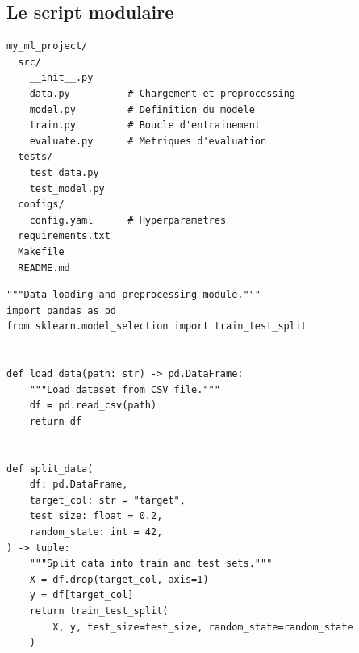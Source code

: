 \subsection{Le script modulaire}

\begin{bonnepratique}[title=\textbf{Structure de projet recommand\'ee}]
\begin{verbatim}
my_ml_project/
  src/
    __init__.py
    data.py          # Chargement et preprocessing
    model.py         # Definition du modele
    train.py         # Boucle d'entrainement
    evaluate.py      # Metriques d'evaluation
  tests/
    test_data.py
    test_model.py
  configs/
    config.yaml      # Hyperparametres
  requirements.txt
  Makefile
  README.md
\end{verbatim}
\end{bonnepratique}

\begin{codeblock}[title=\textbf{src/data.py --- Module de donn\'ees}]
\begin{verbatim}
"""Data loading and preprocessing module."""
import pandas as pd
from sklearn.model_selection import train_test_split


def load_data(path: str) -> pd.DataFrame:
    """Load dataset from CSV file."""
    df = pd.read_csv(path)
    return df


def split_data(
    df: pd.DataFrame,
    target_col: str = "target",
    test_size: float = 0.2,
    random_state: int = 42,
) -> tuple:
    """Split data into train and test sets."""
    X = df.drop(target_col, axis=1)
    y = df[target_col]
    return train_test_split(
        X, y, test_size=test_size, random_state=random_state
    )
\end{verbatim}
\end{codeblock}


